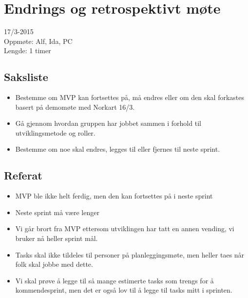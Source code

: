 \section{Endrings og retrospektivt møte}
\label{app:MotereferaterSprint2_endringsOgRetrospektivMote}
17/3-2015 
\\Oppmøte: Alf, Ida, PC
\\Lengde: 1 timer 
 
\subsection{Saksliste}
\begin{itemize}
\item Bestemme om MVP kan fortsettes på, må endres eller om den skal forkastes basert på demomøte med Norkart 16/3. 
\item Gå gjennom hvordan gruppen har jobbet sammen i forhold til utviklingsmetode og roller.
\item Bestemme om noe skal endres, legges til eller fjernes til neste sprint.
\end{itemize}

\subsection{Referat }
\begin{itemize}
\item MVP ble ikke helt ferdig, men den kan fortsettes på i neste sprint 
\item Neste sprint må være lenger
\item Vi går brort fra MVP ettersom utviklingen har tatt en annen vending, vi bruker nå heller sprint mål. 
\item Tasks skal ikke tildeles til personer på planleggingsmøte, men heller taes når folk skal jobbe med dette. 
\item Vi skal prøve å legge til så mange estimerte tasks som trengs for å kommendesprint, men det er også lov til å legge til tasks mitt i sprinten. 
\end{itemize} 
